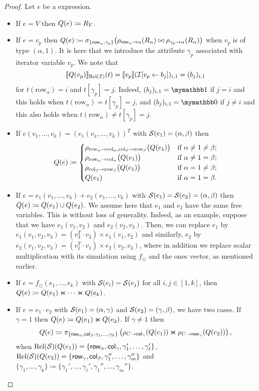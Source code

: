 \begin{proof}
Let $e$ be a \langsum expression.
\begin{itemize}
  \item If $e=V$ then $Q (e)\coloneqq R_V$.
  \item If $e=v_p$ then $Q (e)\coloneqq \sigma_{\lbrace \mathsf{row}_\alpha,\gamma_p\rbrace}\bigl(\rho_{\mathsf{row}_\alpha\to \alpha}(R_\alpha)\bowtie \rho_{\gamma_p\to \alpha}(R_\alpha)\bigr)$ when  $v_p$ is of type $(\alpha,1)$. It is here that we introduce the attribute $\gamma_p$ associated with iterator variable $v_p$.
 We note that 
$$ \llbracket Q(v_p) \rrbracket_{\text{Rel}(\mathcal{I})}(t)=\llbracket v_p \rrbracket(\mathcal{I}[v_p\gets b_{j}])_{i,1}=(b_j)_{i,1}
$$
for $t(\mathrm{row}_\alpha)=i$ and $t[\gamma_p]=j$. Indeed, $(b_j)_{i,1}=\kone$ if $j=i$
and this holds when $t(\mathrm{row}_\alpha)=t[\gamma_p]=j$, and $(b_j)_{i,1}=\kzero$ if $j\neq i$
and this also holds when $t(\mathrm{row}_\alpha)\neq t[\gamma_p]=j$.

  \item If $e(v_1,\ldots,v_k)=(e_1(v_1,\ldots,v_k))^T$ with $\mathcal{S} (e_1)=(\alpha, \beta)$ then \[
Q(e) \coloneqq 
\begin{cases}
\rho_{\mathrm{row}_\alpha \to \mathrm{col}_\alpha,\mathrm{col}_\beta \to \mathrm{row}_\beta}\bigl(Q(e_1)\bigr) & \text{if } \alpha \neq 1 \neq \beta; \cr
\rho_{\mathrm{row}_\alpha \to \mathrm{col}_\alpha}\bigl(Q(e_1)\bigr) & \text{if } \alpha \neq 1 = \beta; \cr
\rho_{\mathrm{col}_\beta \to \mathrm{row}_\beta}\bigl(Q(e_1)\bigr) & \text{if } \alpha = 1 \neq \beta; \cr
Q(e_1) & \text{if } \alpha = 1 = \beta.
\end{cases}
\]
\item If $e=e_1(v_1,\ldots,v_k)+e_2(v_1,\ldots,v_k)$ with $\mathcal{S} (e_1)=\mathcal{S} (e_2)=(\alpha, \beta)$ then $Q (e)\coloneqq Q (e_1)\cup Q (e_2)$. We assume here that $e_1$ and $e_2$ have the same free variables. This is without loss of generality. Indeed, as an example, suppose that we have $e_1(v_1,v_2)$
and $e_2(v_2,v_3)$. Then, we can replace $e_1$ by  $e_1(v_1,v_2,v_3)=(v_3^T\cdot v_3)\times e_1(v_1,v_2)$
and similarly, $e_2$ by $e_2(v_1,v_2,v_3)=(v_1^T\cdot v_1)\times e_2(v_2,v_3)$, where in addition we replace scalar multiplication with its simulation using $f_{\odot}$ and the ones vector, as mentioned earlier. 

  \item If $e=f_\odot(e_1,\ldots, e_k)$ with $\mathcal{S}(e_i)=\mathcal{S}(e_j)$ for all $i,j\in[1,k]$, then $Q(e)\coloneqq Q(e_1)\Join \cdots \Join Q(e_k)$.

  \item If $e=e_1\cdot e_2$ with $\mathcal{S} (e_1)=(\alpha, \gamma)$ and $\mathcal{S} (e_2)=(\gamma, \beta)$, we have two cases. If $\gamma = 1$ then $Q (e)\coloneqq Q (e_1)\Join Q (e_2)$.
If $\gamma\neq 1$ then
$$
Q (e) \coloneqq  \pi_{\lbrace \mathsf{row}_{\alpha},\mathsf{col}_{\beta}, \gamma_1,\ldots,\gamma_k \rbrace}\left(\rho_{C\to \mathsf{col}_\gamma}(Q (e_1))\Join \rho_{C\to \mathsf{row}_\gamma}(Q (e_2)) \right),
$$
when $\text{Rel}(\mathcal{S})(Q(e_1))=\{\mathsf{row}_\alpha,\mathsf{col}_\gamma,\gamma_1',\ldots,\gamma_{\ell}'\}$,
$\text{Rel}(\mathcal{S})(Q(e_2))=\{\mathsf{row}_\gamma,\mathsf{col}_\beta,\gamma_1'',\ldots,\gamma_{m}''\}$ and $\{\gamma_1,\ldots,\gamma_k\}\coloneqq \{\gamma_1',\ldots,\gamma_\ell',\gamma_1'',\ldots,\gamma_m''\}$.


\end{itemize}
\end{proof}
